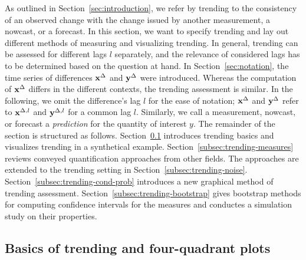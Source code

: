 
As outlined in Section~\ref{sec:introduction}, we refer by trending to the consistency of an observed change with the change issued by another measurement, a nowcast, or a forecast.
In this section, we want to specify trending and lay out different methods of measuring and visualizing trending. 
In general, trending can be assessed for different lags $l$ separately, and the relevance of considered lags has to be determined based on the question at hand.
In Section~\ref{sec:notation}, the time series of differences $\mathbf{x}^{\Delta}$ and $\mathbf{y}^{\Delta}$ were introduced.
Whereas the computation of $\mathbf{x}^{\Delta}$ differs in the different contexts, the trending assessment is similar.
In the following, we omit the difference's lag $l$ for the ease of notation; $\mathbf{x}^{\Delta}$ and $\mathbf{y}^{\Delta}$ refer to $\mathbf{x}^{\Delta,l}$ and $\mathbf{y}^{\Delta,l}$ for a common lag $l$.
Similarly, we call a measurement, nowcast, or forecast a \textit{prediction} for the quantity of interest $y$. 
The remainder of the section is structured as follows.
Section~\ref{subsec:trending-basics} introduces trending basics and visualizes trending in a synthetical example.
Section~\ref{subsec:trending-measures} reviews conveyed quantification approaches from other fields.
The approaches are extended to the trending setting in Section~\ref{subsec:trending-noise}.
Section~\ref{subsec:trending-cond-prob} introduces a new graphical method of trending assessment.
Section~\ref{subsec:trending-bootstrap} gives bootstrap methods for computing confidence intervals for the measures and conductes a simulation study on their properties.


\subsection{Basics of trending and four-quadrant plots}\label{subsec:trending-basics}

